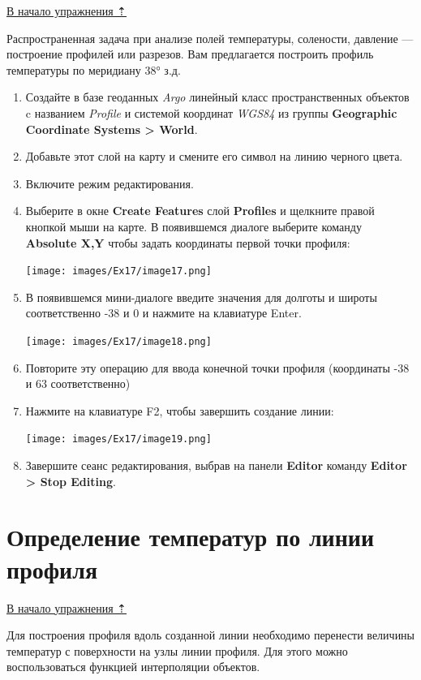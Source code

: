 \documentclass[12pt,]{book}
\begin{document}
\protect\hyperlink{interpolation}{В начало упражнения ⇡}

Распространенная задача при анализе полей температуры, солености, давление --- построение профилей или разрезов. Вам предлагается построить профиль температуры по меридиану 38° з.д.

\begin{enumerate}
\def\labelenumi{\arabic{enumi}.}
\item
  Создайте в базе геоданных \emph{Argo} линейный класс пространственных объектов c названием \emph{Profile} и системой координат \emph{WGS84} из группы \textbf{Geographic Coordinate Systems \textgreater{} World}.
\item
  Добавьте этот слой на карту и смените его символ на линию черного цвета.
\item
  Включите режим редактирования.
\item
  Выберите в окне \textbf{Create Features} слой \textbf{Profiles} и щелкните правой кнопкой мыши на карте. В появившемся диалоге выберите команду \textbf{Absolute X,Y} чтобы задать координаты первой точки профиля:

  \texttt{[image: images/Ex17/image17.png]}
\item
  В появившемся мини-диалоге введите значения для долготы и широты соответственно -38 и 0 и нажмите на клавиатуре Enter.

  \texttt{[image: images/Ex17/image18.png]}
\item
  Повторите эту операцию для ввода конечной точки профиля (координаты -38 и 63 соответственно)
\item
  Нажмите на клавиатуре F2, чтобы завершить создание линии:

  \texttt{[image: images/Ex17/image19.png]}
\item
  Завершите сеанс редактирования, выбрав на панели \textbf{Editor} команду \textbf{Editor \textgreater{} Stop Editing}.
\end{enumerate}

\hypertarget{interpolation-temperature}{%
\section{Определение температур по линии профиля}\label{interpolation-temperature}}

\protect\hyperlink{interpolation}{В начало упражнения ⇡}

Для построения профиля вдоль созданной линии необходимо перенести величины температур с поверхности на узлы линии профиля. Для этого можно воспользоваться функцией интерполяции объектов.
\end{document}
